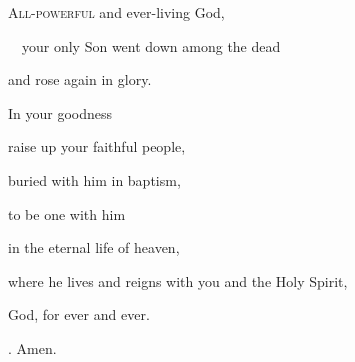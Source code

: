 \lettrine[loversize=0.15,lines=2]{A}{ll-powerful} and ever-living God,\par
~~your only Son went down among the dead\par
\noindent and rose again in glory.\par
\noindent In your goodness\par
\noindent raise up your faithful people,\par
\noindent buried with him in baptism,\par
\noindent to be one with him\par
\noindent in the eternal life of heaven,\par
\noindent where he lives and reigns with you and the Holy Spirit,\par
\noindent God, for ever and ever. 
\par \noindent \Rbar. Amen.